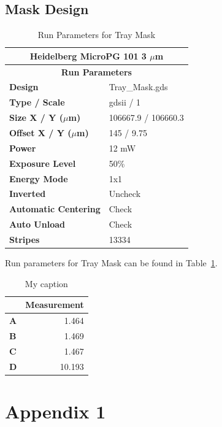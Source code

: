 \documentclass[12pt]{article}
\numberwithin{equation}{section}
\numberwithin{table}{section}
\numberwithin{figure}{section}
\begin{document}
\subsection{Mask Design}


\begin{table}[]
\centering
\caption{Run Parameters for Tray Mask}
\label{TM}
\begin{tabular}{@{}ll@{}}
\toprule
\multicolumn{2}{c}{\textbf{Heidelberg MicroPG 101 3 $\mu$m}} \\ \midrule
\multicolumn{2}{c}{\textbf{Run Parameters}} \\
\textbf{Design} & Tray\_Mask.gds \\
\textbf{Type / Scale} & gdsii / 1 \\
\textbf{Size X / Y ($\mu$m)} & 106667.9 / 106660.3 \\
\textbf{Offset X / Y ($\mu$m)} & 145 / 9.75 \\
\textbf{Power} & 12 mW \\
\textbf{Exposure Level} & 50\% \\
\textbf{Energy Mode} & 1x1 \\
\textbf{Inverted} & Uncheck \\
\textbf{Automatic Centering} & Check \\
\textbf{Auto Unload} & Check \\
\textbf{Stripes} & 13334 \\ \bottomrule
\end{tabular}
\end{table}

Run parameters for Tray Mask can be found in Table~\ref{TM}.

\begin{table}[]
\centering
\caption{My caption}
\label{my-label}
\begin{tabular}{@{}lr@{}}
\toprule
 & \multicolumn{1}{l}{\textbf{Measurement}} \\ \midrule
\textbf{A} & 1.464 \\
\textbf{B} & 1.469 \\
\textbf{C} & 1.467 \\
\textbf{D} & 10.193 \\ \bottomrule
\end{tabular}
\end{table}

 
\appendix

\section{Appendix 1} 
\label{appendix_1}
\end{document}
